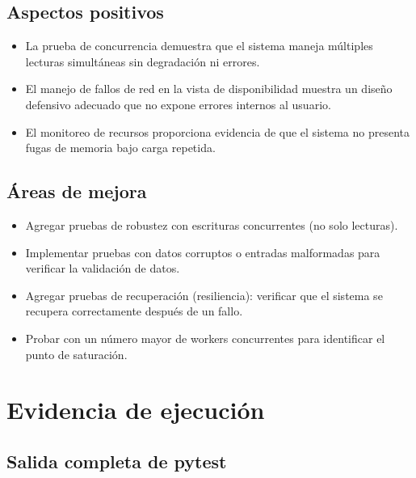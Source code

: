 \documentclass[12pt,a4paper]{article}
\begin{document}
\subsection{Aspectos positivos}

\begin{itemize}
  \item La prueba de concurrencia demuestra que el sistema maneja múltiples lecturas
        simultáneas sin degradación ni errores.
  \item El manejo de fallos de red en la vista de disponibilidad muestra un diseño defensivo
        adecuado que no expone errores internos al usuario.
  \item El monitoreo de recursos proporciona evidencia de que el sistema no presenta fugas
        de memoria bajo carga repetida.
\end{itemize}

\subsection{Áreas de mejora}

\begin{itemize}
  \item Agregar pruebas de robustez con escrituras concurrentes (no solo lecturas).
  \item Implementar pruebas con datos corruptos o entradas malformadas para verificar
        la validación de datos.
  \item Agregar pruebas de recuperación (resiliencia): verificar que el sistema se recupera
        correctamente después de un fallo.
  \item Probar con un número mayor de workers concurrentes para identificar el punto de
        saturación.
\end{itemize}

\newpage
\section{Evidencia de ejecución}

\subsection{Salida completa de pytest}
\end{document}
